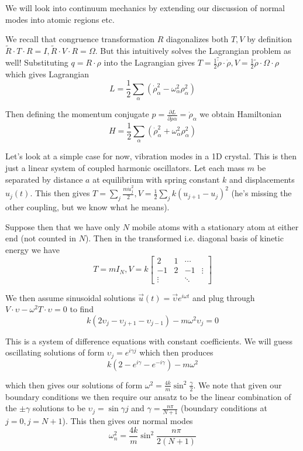 \documentclass[10pt]{report}
\newcommand{\pd}[2]{\frac{\partial #1}{\partial#2}}
\begin{document}
We will look into continuum mechanics by extending our discussion of normal modes into atomic regions etc.

We recall that congruence transformation $R$ diagonalizes both $T,V$ by definition $\tilde{R}\cdot T \cdot R = I, \tilde{R}\cdot V \cdot R = \Omega$. But this intuitively solves the Lagrangian problem as well! Substituting $q = R\cdot \rho$ into the Lagrangian gives $T = \frac{1}{2}\tilde{\dot{\rho}}\cdot \dot{\rho}, V = \frac{1}{2}\tilde{\rho}\cdot \Omega \cdot \rho$ which gives Lagrangian
$$L = \frac{1}{2}\sum_\alpha\left( \dot{\rho}_\alpha^2 - \omega_\alpha^2\rho_\alpha^2 \right)$$

Then defining the momentum conjugate $p = \pd{L}{\dot{\rho}\alpha} = \dot{\rho}_\alpha$ we obtain Hamiltonian
$$H = \frac{1}{2}\sum_\alpha\left( \dot{\rho}_\alpha^2 + \omega_\alpha^2\rho_\alpha^2 \right)$$

Let's look at a simple case for now, vibration modes in a 1D crystal. This is then just a linear system of coupled harmonic oscillators. Let each mass $m$ be separated by distance $a$ at equilibrium with spring constant $k$ and displacements $u_j(t)$. This then gives $T = \sum_j \frac{m\dot{u}_j^2}{2}, V = \frac{1}{2}\sum_j k\left( u_{j+1} - u_j \right)^2$ (he's missing the other coupling, but we know what he means). 

Suppose then that we have only $N$ mobile atoms with a stationary atom at either end (not counted in $N$). Then in the transformed i.e. diagonal basis of kinetic energy we have
$$T = mI_N, V = k\begin{bmatrix}2&1&\cdots&\\-1 & 2 & -1 &\vdots \\ \vdots  &&\ddots&\ \end{bmatrix} $$

We then assume sinusoidal solutions $\vec{u}(t) = \vec{\upsilon} e^{i\omega t}$ and plug through $V\cdot \upsilon - \omega^2 T \cdot \upsilon = 0$ to find
$$k(2\upsilon_j - \upsilon_{j+1} -\upsilon_{j-1}) - m\omega^2\upsilon_j = 0$$

This is a system of difference equations with constant coefficients. We will guess oscillating solutions of form $\upsilon_j = e^{i\gamma j}$ which then produces
$$k(2-e^{i\gamma} - e^{-i\gamma}) - m\omega^2$$

which then gives our solutions of form $\omega^2 = \frac{4k}{m}\sin^2 \frac{\gamma}{2}$. We note that given our boundary conditions we then require our ansatz to be the linear combination of the $\pm \gamma$ solutions to be $\upsilon_j = \sin \gamma j$ and $\gamma = \frac{n\pi}{N+1}$ (boundary conditions at $j=0,j=N+1$). This then gives our normal modes
$$\omega_n^2 = \frac{4k}{m}\sin^2\frac{n\pi}{2(N+1)}$$
\end{document}
